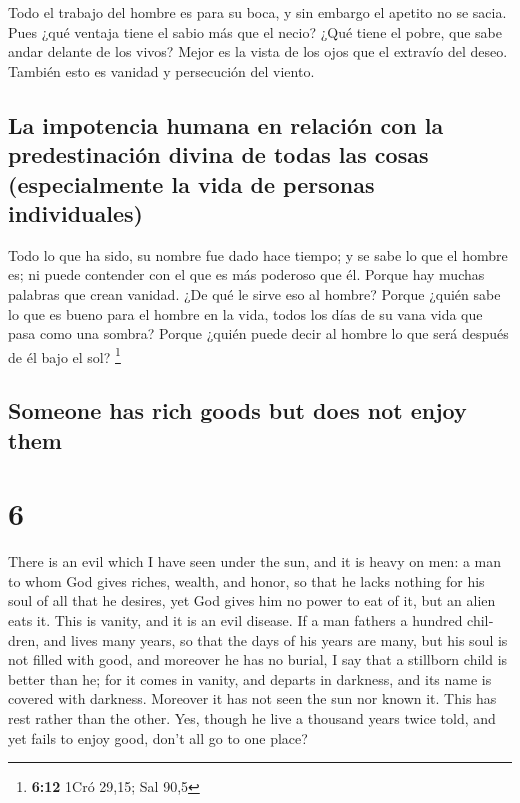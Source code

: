 \begin{paracol}{2}
 Todo el trabajo del hombre es para su boca, y sin embargo
el apetito no se sacia.  Pues ¿qué ventaja tiene el sabio
más que el necio? ¿Qué tiene el pobre, que sabe andar delante de los
vivos?  Mejor es la vista de los ojos que el extravío del
deseo. También esto es vanidad y persecución del viento.

\hypertarget{la-impotencia-humana-en-relaciuxf3n-con-la-predestinaciuxf3n-divina-de-todas-las-cosas-especialmente-la-vida-de-personas-individuales}{%
\subsection{La impotencia humana en relación con la predestinación
divina de todas las cosas (especialmente la vida de personas
individuales)}\label{la-impotencia-humana-en-relaciuxf3n-con-la-predestinaciuxf3n-divina-de-todas-las-cosas-especialmente-la-vida-de-personas-individuales}}

 Todo lo que ha sido, su nombre fue dado hace tiempo; y
se sabe lo que el hombre es; ni puede contender con el que es más
poderoso que él.  Porque hay muchas palabras que crean
vanidad. ¿De qué le sirve eso al hombre?  Porque ¿quién
sabe lo que es bueno para el hombre en la vida, todos los días de su
vana vida que pasa como una sombra? Porque ¿quién puede decir al hombre
lo que será después de él bajo el sol? \footnote{\textbf{6:12} 1Cró
  29,15; Sal 90,5}

\switchcolumn
\begin{otherlanguage}{english}

\hypertarget{someone-has-rich-goods-but-does-not-enjoy-them}{%
\subsection{Someone has rich goods but does not enjoy
them}\label{someone-has-rich-goods-but-does-not-enjoy-them}}

\hypertarget{section-11}{%
\section{6}\label{section-11}}

 There is an evil which I have seen under the sun, and it
is heavy on men:  a man to whom God gives riches, wealth,
and honor, so that he lacks nothing for his soul of all that he desires,
yet God gives him no power to eat of it, but an alien eats it. This is
vanity, and it is an evil disease.  If a man fathers a
hundred children, and lives many years, so that the days of his years
are many, but his soul is not filled with good, and moreover he has no
burial, I say that a stillborn child is better than he; 
for it comes in vanity, and departs in darkness, and its name is covered
with darkness.  Moreover it has not seen the sun nor known
it. This has rest rather than the other.  Yes, though he
live a thousand years twice told, and yet fails to enjoy good, don't all
go to one place?


\end{otherlanguage}
\end{paracol}
